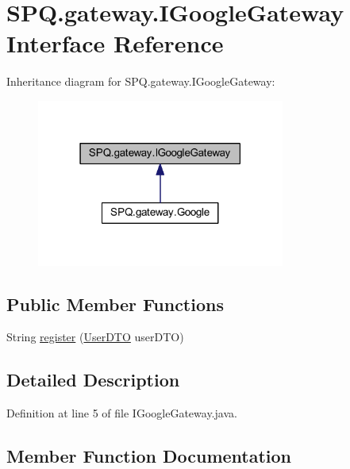 \hypertarget{interface_s_p_q_1_1gateway_1_1_i_google_gateway}{}\section{S\+P\+Q.\+gateway.\+I\+Google\+Gateway Interface Reference}
\label{interface_s_p_q_1_1gateway_1_1_i_google_gateway}


Inheritance diagram for S\+P\+Q.\+gateway.\+I\+Google\+Gateway\+:\nopagebreak
\begin{figure}[H]
\begin{center}
\leavevmode
\includegraphics[width=231pt]{interface_s_p_q_1_1gateway_1_1_i_google_gateway__inherit__graph}
\end{center}
\end{figure}
\subsection*{Public Member Functions}
\begin{DoxyCompactItemize}
\item 
String \mbox{\hyperlink{interface_s_p_q_1_1gateway_1_1_i_google_gateway_a35bfcf888bfbf45ab05f33c89348052a}{register}} (\mbox{\hyperlink{class_s_p_q_1_1dto_1_1_user_d_t_o}{User\+D\+TO}} user\+D\+TO)
\end{DoxyCompactItemize}


\subsection{Detailed Description}


Definition at line 5 of file I\+Google\+Gateway.\+java.



\subsection{Member Function Documentation}
\mbox{\label{interface_s_p_q_1_1gateway_1_1_i_google_gateway_a35bfcf888bfbf45ab05f33c89348052a}} 
